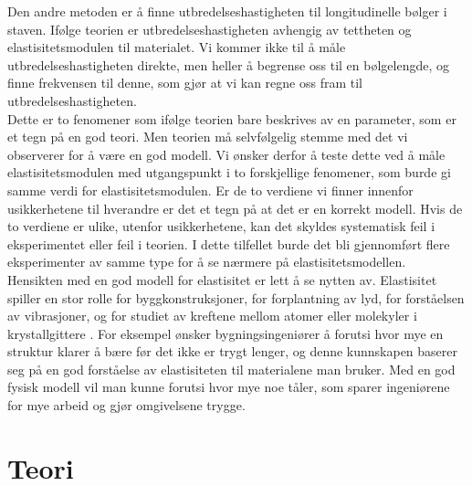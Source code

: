 \documentclass[%
 reprint,
nofootinbib,
aps,
]{revtex4-1}
\begin{document}
Den andre metoden er å finne utbredelseshastigheten til longitudinelle bølger i staven. Ifølge teorien er utbredelseshastigheten avhengig av tettheten og elastisitetsmodulen til materialet. Vi kommer ikke til å måle utbredelseshastigheten direkte, men heller å begrense oss til en bølgelengde, og finne frekvensen til denne, som gjør at vi kan regne oss fram til utbredelseshastigheten.\\
Dette er to fenomener som ifølge teorien bare beskrives av en parameter, som er et tegn på en god teori. Men teorien må selvfølgelig stemme med det vi observerer for å være en god modell. Vi ønsker derfor å teste dette ved å måle elastisitetsmodulen med utgangspunkt i to forskjellige fenomener, som burde gi samme verdi for elastisitetsmodulen. Er de to verdiene vi finner innenfor usikkerhetene til hverandre er det et tegn på at det er en korrekt modell. Hvis de to verdiene er ulike, utenfor usikkerhetene, kan det skyldes systematisk feil i eksperimentet eller feil i teorien. I dette tilfellet burde det bli gjennomført flere eksperimenter av samme type for å se nærmere på elastisitetsmodellen.\\
Hensikten med en god modell for elastisitet er lett å se nytten av. Elastisitet spiller en stor rolle for byggkonstruksjoner, for forplantning av lyd, for forståelsen av vibrasjoner, og for studiet av kreftene mellom atomer eller molekyler i krystallgittere \cite{gronn}. For eksempel ønsker bygningsingeniører å forutsi hvor mye en struktur klarer å bære før det ikke er trygt lenger, og denne kunnskapen baserer seg på en god forståelse av elastisiteten til materialene man bruker. Med en god fysisk modell vil man kunne forutsi hvor mye noe tåler, som sparer ingeniørene for mye arbeid og gjør omgivelsene trygge.
\section{Teori}
\end{document}
